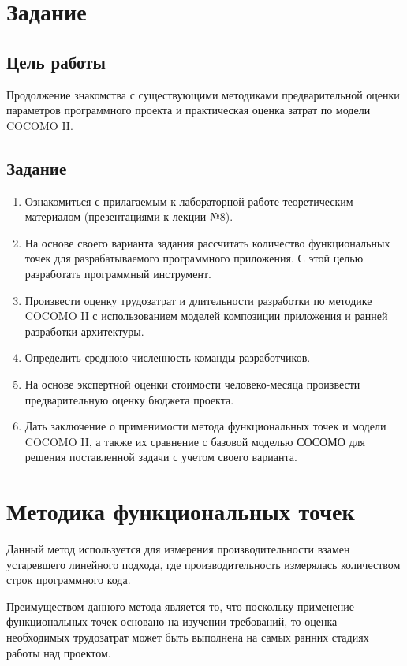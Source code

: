 \chapter{Задание}

\section{Цель работы}

Продолжение знакомства с существующими методиками предварительной оценки параметров программного проекта и практическая оценка затрат по модели COCOMO II.

\section{Задание}

\begin{enumerate}
    \item Ознакомиться с прилагаемым к лабораторной работе теоретическим материалом (презентациями к лекции №8).
    \item На основе своего варианта задания рассчитать количество
функциональных точек для разрабатываемого программного
приложения. С этой целью разработать программный инструмент.
    \item Произвести оценку трудозатрат и длительности разработки по
методике COCOMO II с использованием моделей композиции
приложения и ранней разработки архитектуры.
    \item Определить среднюю численность команды разработчиков.
    \item На основе экспертной оценки стоимости человеко-месяца произвести предварительную оценку бюджета проекта.
    \item Дать заключение о применимости метода функциональных точек и модели COCOMO II, а также их сравнение с базовой моделью СОСОМО для решения поставленной задачи с учетом своего варианта.
\end{enumerate}

\chapter{Методика функциональных точек}

Данный метод используется для измерения производительности взамен устаревшего линейного подхода, где производительность измерялась количеством строк программного кода. 

Преимуществом данного метода является то, что поскольку применение функциональных точек основано на изучении требований, то оценка необходимых трудозатрат может быть выполнена на самых ранних стадиях работы над проектом.

